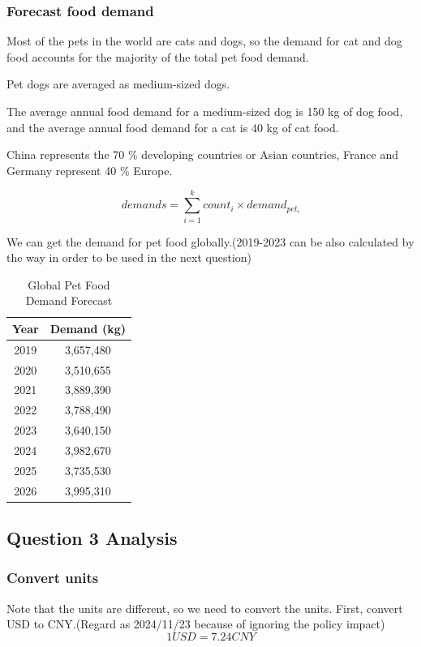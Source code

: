 \documentclass[withoutpreface,bwprint]{cumcmthesis} %
\begin{document}
\subsubsection{Forecast food demand}
\begin{assumption}
    Most of the pets in the world are cats and dogs, so the demand for cat and dog food accounts for the majority of the total pet food demand.
\end{assumption}
\begin{assumption}
    Pet dogs are averaged as medium-sized dogs.
\end{assumption}
\par The average annual food demand for a medium-sized dog is 150 kg of dog food, and the average annual food demand for a cat is 40 kg of cat food.\cite{4}
\begin{assumption}
    China represents the 70 \% developing countries or Asian countries, France and Germany represent 40 \% Europe.
\end{assumption}
 \[demands=\sum_{i=1}^{k} count_i \times demand_{pet_i}\]
\par We can get the demand for pet food globally.(2019-2023 can be also calculated by the way in order to be used in the next question)

\begin{table}[htbp]
\centering
\caption{Global Pet Food Demand Forecast}
\begin{tabular}{cc}
\toprule
Year & Demand (kg) \\
\midrule
2019 & 3,657,480 \\
2020 & 3,510,655 \\
2021 & 3,889,390 \\
2022 & 3,788,490 \\
2023 & 3,640,150 \\
2024 & 3,982,670 \\
2025 & 3,735,530 \\
2026 & 3,995,310 \\
\bottomrule
\end{tabular}
\end{table}


\subsection{Question 3 Analysis}
\subsubsection{Convert units}
\par Note that the units are different, so we need to convert the units. First, convert USD to CNY.(Regard as 2024/11/23 because of ignoring the policy impact)\cite{5}
\[1USD=7.24CNY\]
\end{document}

